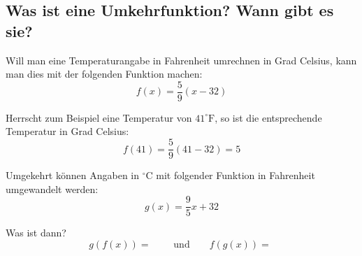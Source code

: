 \subsection{Was ist eine Umkehrfunktion? Wann gibt es sie?}
\begin{example}
    Will man eine Temperaturangabe in Fahrenheit umrechnen in Grad Celsius, kann man dies mit der folgenden Funktion machen:
    \[
        f(x) = \frac{5}{9}(x - 32)
    \]

    Herrscht zum Beispiel eine Temperatur von \(41^\circ \text{F}\), so ist die entsprechende Temperatur in Grad Celsius:
    \[
        f(41) = \frac{5}{9}(41 - 32) = 5
    \]

    Umgekehrt können Angaben in \(^\circ \text{C}\) mit folgender Funktion in Fahrenheit umgewandelt werden:
    \[
        g(x) = \frac{9}{5}x + 32
    \]

    Was ist dann?
    \[
        g(f(x)) = \;  \qquad \text{und} \qquad f(g(x)) = \;
    \]
\end{example}
